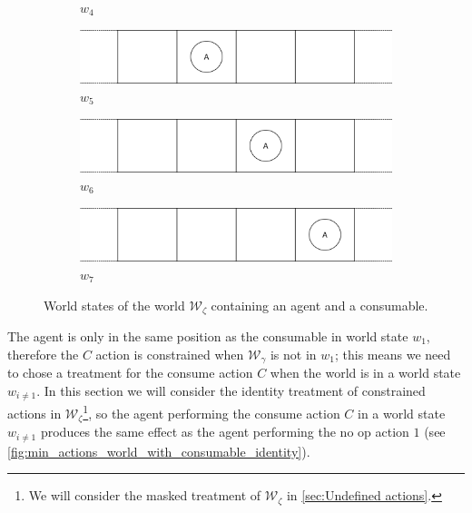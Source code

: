 \begin{figure}[H]
\begin{subfigure}{0.48\textwidth}
    \caption{$w_{4}$}
    \label{fig:w4}
  \end{subfigure}%
  \hfill
  \begin{subfigure}{0.48\textwidth}
    \centering
    \includegraphics[width=\textwidth]{5BeyondSBDRLGlobalAlgebras/Images/Consumable_world_states/w5.png}
    \caption{$w_{5}$}
    \label{fig:w5}
  \end{subfigure}%
  \vspace{0.5cm}
  \begin{subfigure}{0.48\textwidth}
    \centering
    \includegraphics[width=\textwidth]{5BeyondSBDRLGlobalAlgebras/Images/Consumable_world_states/w6.png}
    \caption{$w_{6}$}
    \label{fig:w6}
  \end{subfigure}%
  \hfill
  \begin{subfigure}{0.48\textwidth}
    \centering
    \includegraphics[width=\textwidth]{5BeyondSBDRLGlobalAlgebras/Images/Consumable_world_states/w7.png}
    \caption{$w_{7}$}
    \label{fig:w7}
  \end{subfigure}%
  
  \caption{
  World states of the world $\mathscr{W}_{\zeta}$ containing an agent and a consumable.
  }
  \label{fig:4x1_consumable_world_states}
\end{figure}

The agent is only in the same position as the consumable in world state $w_{1}$, therefore the $C$ action is constrained when $\mathscr{W}_{\gamma}$ is not in $w_{1}$; this means we need to chose a treatment for the consume action $C$ when the world is in a world state $w_{i \neq 1}$.
In this section we will consider the identity treatment of constrained actions in $\mathscr{W}_{\zeta}$\footnote{
We will consider the masked treatment of $\mathscr{W}_{\zeta}$ in \cref{sec:Undefined actions}.
}, so the agent performing the consume action $C$ in a world state $w_{i \neq 1}$ produces the same effect as the agent performing the no op action $1$ (see \cref{fig:min_actions_world_with_consumable_identity}).

